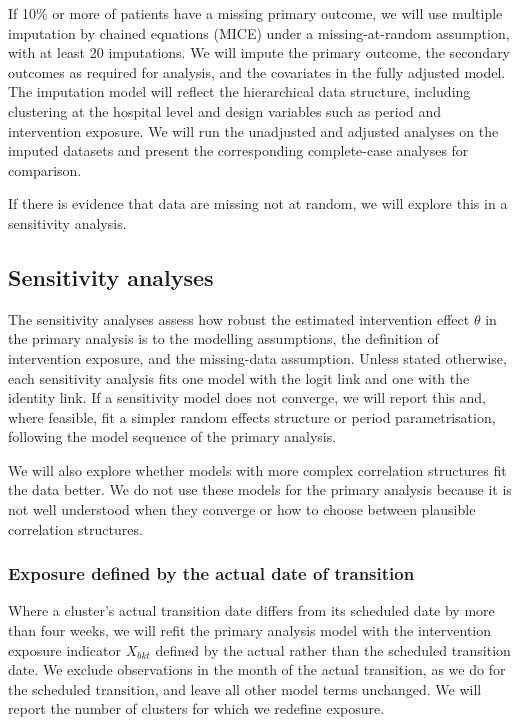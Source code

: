 \documentclass[
]{scrartcl}
\begin{document}
If 10\% or more of patients have a missing primary outcome, we will use
multiple imputation by chained equations (MICE) under a
missing-at-random assumption, with at least 20 imputations. We will
impute the primary outcome, the secondary outcomes as required for
analysis, and the covariates in the fully adjusted model. The imputation
model will reflect the hierarchical data structure, including clustering
at the hospital level and design variables such as period and
intervention exposure. We will run the unadjusted and adjusted analyses
on the imputed datasets and present the corresponding complete-case
analyses for comparison.

If there is evidence that data are missing not at random, we will
explore this in a sensitivity analysis.

\subsection{Sensitivity analyses}\label{sec-sensitivity-analyses}

The sensitivity analyses assess how robust the estimated intervention
effect \(\theta\) in the primary analysis is to the modelling
assumptions, the definition of intervention exposure, and the
missing-data assumption. Unless stated otherwise, each sensitivity
analysis fits one model with the logit link and one with the identity
link. If a sensitivity model does not converge, we will report this and,
where feasible, fit a simpler random effects structure or period
parametrisation, following the model sequence of the primary analysis.

We will also explore whether models with more complex correlation
structures fit the data better. We do not use these models for the
primary analysis because it is not well understood when they converge or
how to choose between plausible correlation structures.

\subsubsection{Exposure defined by the actual date of
transition}\label{sec-exposure-defined-by-the-actual-date-of-transition}

Where a cluster's actual transition date differs from its scheduled date
by more than four weeks, we will refit the primary analysis model with
the intervention exposure indicator \(X_{bkt}\) defined by the actual
rather than the scheduled transition date. We exclude observations in
the month of the actual transition, as we do for the scheduled
transition, and leave all other model terms unchanged. We will report
the number of clusters for which we redefine exposure.
\end{document}
